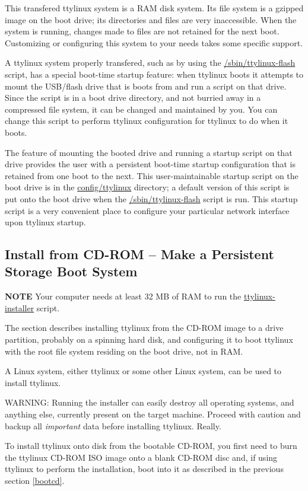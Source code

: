 \documentclass[10pt]{article}
\begin{document}
This transfered ttylinux system is a RAM disk system. Its file system is a
gzipped image on the boot drive; its directories and files are very
inaccessible. When the system is running, changes made to files are not
retained for the next boot. Customizing or configuring this system to your
needs takes some specific support.

A ttylinux system properly transfered, such as by using the
\url{/sbin/ttylinux-flash} script, has a special boot-time startup feature:
when ttylinux boots it attempts to mount the USB/flash drive that is boots from
and run a script on that drive. Since the script is in a boot drive directory,
and not burried away in a compressed file system, it can be changed and
maintained by you. You can change this script to perform ttylinux configuration
for ttylinux to do when it boots.

The feature of mounting the booted drive and running a startup script on that
drive provides the user with a persistent boot-time startup configuration that
is retained from one boot to the next. This user-maintainable startup script on
the boot drive is in the \url{config/ttylinux} directory; a default version of
this script is put onto the boot drive when the \url{/sbin/ttylinux-flash}
script is run. This startup script is a very convenient place to configure your
particular network interface upon ttylinux startup.

\subsection{Install from CD-ROM -- Make a Persistent Storage Boot System}
\label{bootfixed}

{\bf NOTE} Your computer needs at least 32 MB of RAM to run the
\url{ttylinux-installer} script.

The section describes installing ttylinux from the CD-ROM image to a drive
partition, probably on a spinning hard disk, and configuring it to boot
ttylinux with the root file system residing on the boot drive, not in RAM.

A Linux system, either ttylinux or some other Linux system, can be used to
install ttylinux.

WARNING: Running the installer can easily destroy all operating systems, and
anything else, currently present on the target machine. Proceed with caution
and backup all {\it important} data before installing ttylinux. Really.

To install ttylinux onto disk from the bootable CD-ROM, you first need to burn
the ttylinux CD-ROM ISO image onto a blank CD-ROM disc and, if using ttylinux
to perform the installation, boot into it as described in the previous section
\ref{bootcd}.
\end{document}

